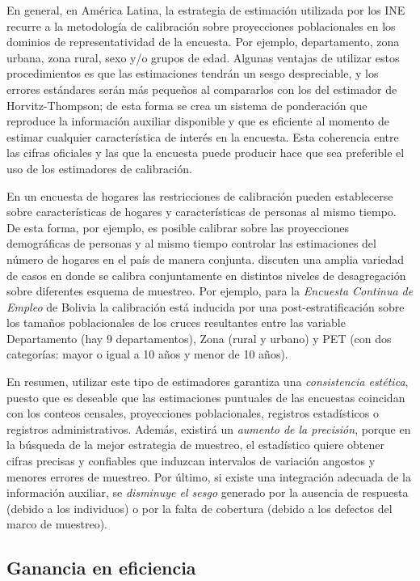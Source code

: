 \documentclass[
  12pt,
  spanish,
]{book}
\begin{document}
En general, en América Latina, la estrategia de estimación utilizada por los INE recurre a la metodología de calibración sobre proyecciones poblacionales en los dominios de representatividad de la encuesta. Por ejemplo, departamento, zona urbana, zona rural, sexo y/o grupos de edad. Algunas ventajas de utilizar estos procedimientos es que las estimaciones tendrán un sesgo despreciable, y los errores estándares serán más pequeños al compararlos con los del estimador de Horvitz-Thompson; de esta forma se crea un sistema de ponderación que reproduce la información auxiliar disponible y que es eficiente al momento de estimar cualquier característica de interés en la encuesta. Esta coherencia entre las cifras oficiales y las que la encuesta puede producir hace que sea preferible el uso de los estimadores de calibración.

En un encuesta de hogares las restricciones de calibración pueden establecerse sobre características de hogares y características de personas al mismo tiempo. De esta forma, por ejemplo, es posible calibrar sobre las proyecciones demográficas de personas y al mismo tiempo controlar las estimaciones del número de hogares en el país de manera conjunta. \citet{Estevao_Sarndal_2006} discuten una amplia variedad de casos en donde se calibra conjuntamente en distintos niveles de desagregación sobre diferentes esquema de muestreo. Por ejemplo, para la \emph{Encuesta Continua de Empleo} de Bolivia la calibración está inducida por una post-estratificación sobre los tamaños poblacionales de los cruces resultantes entre las variable Departamento (hay 9 departamentos), Zona (rural y urbano) y PET (con dos categorías: mayor o igual a 10 años y menor de 10 años).

En resumen, utilizar este tipo de estimadores garantiza una \emph{consistencia estética}, puesto que es deseable que las estimaciones puntuales de las encuestas coincidan con los conteos censales, proyecciones poblacionales, registros estadísticos o registros administrativos. Además, existirá un \emph{aumento de la precisión}, porque en la búsqueda de la mejor estrategia de muestreo, el estadístico quiere obtener cifras precisas y confiables que induzcan intervalos de variación angostos y menores errores de muestreo. Por último, si existe una integración adecuada de la información auxiliar, se \emph{disminuye el sesgo} generado por la ausencia de respuesta (debido a los individuos) o por la falta de cobertura (debido a los defectos del marco de muestreo).

\hypertarget{ganancia-en-eficiencia}{%
\subsection{Ganancia en eficiencia}\label{ganancia-en-eficiencia}}
\end{document}
